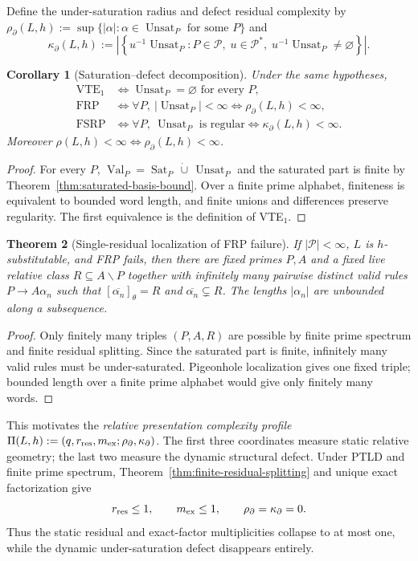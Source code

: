 \documentclass[11pt,a4paper]{article}
\newtheorem{theorem}{Theorem}[section]
\newtheorem{corollary}[theorem]{Corollary}
\newcommand{\Pcal}{\mathcal P}
\newcommand{\Val}{\operatorname{Val}}
\newcommand{\Sat}{\operatorname{Sat}}
\newcommand{\Unsat}{\operatorname{Unsat}}
\begin{document}
Define the under-saturation radius and defect residual complexity by
\(\rho_\partial(L,h):=\sup\{|\alpha|:\alpha\in\Unsat_P\text{ for some }P\}\)
and
\[
  \kappa_\partial(L,h)
  :=
  \left|
  \left\{
    u^{-1}\Unsat_P:
    P\in\Pcal,\;
    u\in\Pcal^*,\;
    u^{-1}\Unsat_P\ne\varnothing
  \right\}
  \right|.
\]

\begin{corollary}[Saturation--defect decomposition]
Under the same hypotheses,
\[
\begin{aligned}
\mathrm{VTE}_1&\iff \Unsat_P=\varnothing\text{ for every }P,\\
\mathrm{FRP}&\iff \forall P,\ |\Unsat_P|<\infty\iff\rho_\partial(L,h)<\infty,\\
\mathrm{FSRP}&\iff \forall P,\ \Unsat_P\text{ is regular}\iff\kappa_\partial(L,h)<\infty.
\end{aligned}
\]
Moreover $\rho(L,h)<\infty\iff\rho_\partial(L,h)<\infty$.
\end{corollary}

\begin{proof}
For every $P$, $\Val_P=\Sat_P\,\dot\cup\,\Unsat_P$ and the saturated part is finite by Theorem~\ref{thm:saturated-basis-bound}.  Over a finite prime alphabet, finiteness is equivalent to bounded word length, and finite unions and differences preserve regularity.  The first equivalence is the definition of VTE$_1$.
\end{proof}

\begin{theorem}[Single-residual localization of FRP failure]
If $|\Pcal|<\infty$, $L$ is $h$-substitutable, and FRP fails, then there are fixed primes $P,A$ and a fixed live relative class $R\subseteq A\backslash P$ together with infinitely many pairwise distinct valid rules $P\to A\alpha_n$ such that $[\overline{\alpha_n}]_\theta=R$ and $\overline{\alpha_n}\subsetneq R$.  The lengths $|\alpha_n|$ are unbounded along a subsequence.
\end{theorem}

\begin{proof}
Only finitely many triples $(P,A,R)$ are possible by finite prime spectrum and finite residual splitting.  Since the saturated part is finite, infinitely many valid rules must be under-saturated.  Pigeonhole localization gives one fixed triple; bounded length over a finite prime alphabet would give only finitely many words.
\end{proof}

This motivates the \emph{relative presentation complexity profile} $\Pi(L,h):=(q,r_{\rm res},m_{\rm ex};\rho_\partial,\kappa_\partial)$.  The first three coordinates measure static relative geometry; the last two measure the dynamic structural defect.  Under PTLD and finite prime spectrum, Theorem~\ref{thm:finite-residual-splitting} and unique exact factorization give
\[
  r_{\rm res}\le1,\qquad m_{\rm ex}\le1,\qquad \rho_\partial=\kappa_\partial=0.
\]
Thus the static residual and exact-factor multiplicities collapse to at most one, while the dynamic under-saturation defect disappears entirely.
\end{document}

